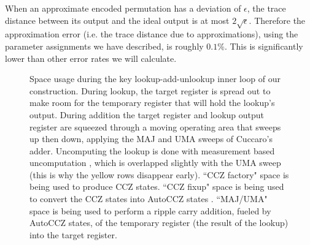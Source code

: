 \documentclass[superscriptaddress,notitlepage,longbibliography]{revtex4-1}
\theoremstyle{definition}
\theoremstyle{definition}
\begin{document}
When an approximate encoded permutation has a deviation of $\epsilon$, the trace distance between its output and the ideal output is at most $2 \sqrt{\epsilon}$.
Therefore the approximation error (i.e. the trace distance due to approximations), using the parameter assignments we have described, is roughly $0.1\%$.
This is significantly lower than other error rates we will calculate.


\begin{figure}
    \label{fig:time-bars}
    \caption{
        Space usage during the key lookup-add-unlookup inner loop of our construction.
        During lookup, the target register is spread out to make room for the temporary register that will hold the lookup's output.
        During addition the target register and lookup output register are squeezed through a moving operating area that sweeps up then down, applying the MAJ and UMA sweeps of Cuccaro's adder.
        Uncomputing the lookup is done with measurement based uncomputation \cite{berry2019qubitization}, which is overlapped slightly with the UMA sweep (this is why the yellow rows disappear early).
        ``CCZ factory" space is being used to produce CCZ states.
        ``CCZ fixup" space is being used to convert the CCZ states into AutoCCZ states \cite{gidney2019autoccz}.
        ``MAJ/UMA" space is being used to perform a ripple carry addition, fueled by AutoCCZ states, of the temporary register (the result of the lookup) into the target register.
    }
\end{figure}
\end{document}
